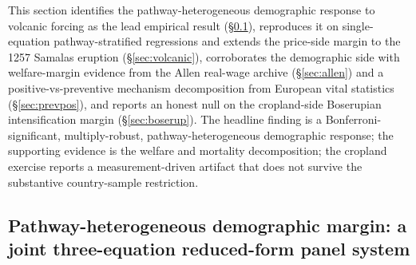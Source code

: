\documentclass[11pt,letterpaper]{article}
\begin{document}
This section identifies the pathway-heterogeneous demographic response to volcanic forcing as the lead empirical result (\S\ref{sec:joint-var}), reproduces it on single-equation pathway-stratified regressions and extends the price-side margin to the 1257 Samalas eruption (\S\ref{sec:volcanic}), corroborates the demographic side with welfare-margin evidence from the Allen real-wage archive (\S\ref{sec:allen}) and a positive-vs-preventive mechanism decomposition from European vital statistics (\S\ref{sec:prevpos}), and reports an honest null on the cropland-side Boserupian intensification margin (\S\ref{sec:boserup}). The headline finding is a Bonferroni-significant, multiply-robust, pathway-heterogeneous demographic response; the supporting evidence is the welfare and mortality decomposition; the cropland exercise reports a measurement-driven artifact that does not survive the substantive country-sample restriction.

\subsection{Pathway-heterogeneous demographic margin: a joint three-equation reduced-form panel system}
\label{sec:joint-var}
\end{document}
